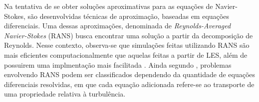 \documentclass[_ArquivoPrincipal.tex]{subfiles}
\begin{document}
Na tentativa de se obter soluções aproximativas para as equações de Navier-Stokes, são desenvolvidas técnicas de aproximação, baseadas em equações diferenciais. Uma dessas aproximações, denominada de \textit{Reynolds-Averaged Navier-Stokes} (RANS) busca encontrar uma solução a partir da decomposição de Reynolds. Nesse contexto, observa-se que simulações feitas utilizando RANS são mais eficientes computacionalmente que aquelas feitas a partir de LES, além de possuirem uma implmentação mais facilitada \cite{alfonsi2009reynolds, ling2015evaluation}. Ainda segundo , problemas envolvendo RANS podem ser classificados dependendo da quantidade de equações diferenciais resolvidas, em que cada equação adicionada refere-se ao transporte de uma propriedade relativa à turbulência.
\end{document}
